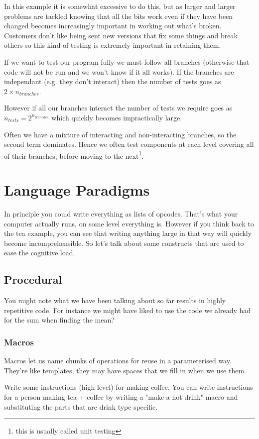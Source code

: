 \documentclass{article}
\begin{document}
In this example it is somewhat excessive to do this, but as larger and larger
problems are tackled knowing that all the bits work even if they have been
changed becomes increasingly important in working out what's broken.
Customers don't like being sent new versions that fix some things and break
others so this kind of testing is extremely important in retaining them.

If we want to test our program fully we must follow all branches (otherwise
that code will not be run and we won't know if it all works).
If the branches are independant (e.g. they don't interact) then the number of
tests goes as $2 \times n_{branches}$.

However if all our branches interact the number of tests we require goes as
$n_{tests} = 2^{n_{branches}}$ which quickly becomes impractically large.

Often we have a mixture of interacting and non-interacting branches, so the
second term dominates.
Hence we often test components at each level covering all of their branches,
before moving to the next\footnote{this is usually called unit testing}.

\section{Language Paradigms}
In principle you could write everything as lists of opcodes. That's what your
computer actually runs, on some level everything is. However if you think back
to the tea example, you can see that writing anything large in that way will
quickly become incomprehensible. So let's talk about some constructs that are
used to ease the cognitive load.
\subsection{Procedural}
You might note what we have been talking about so far results in highly
repetitive code.  For instance we might have liked to use the code we already
had for the sum when finding the mean?
\subsubsection{Macros}
Macros let us name chunks of operations for reuse in a parameterised way.
They're like templates, they may have spaces that we fill in when we use them.

Write some instructions (high level) for making coffee.
You can write instructions for a person making tea + coffee by writing a "make
a hot drink" macro and substituting the parts that are drink type specific.
\end{document}

